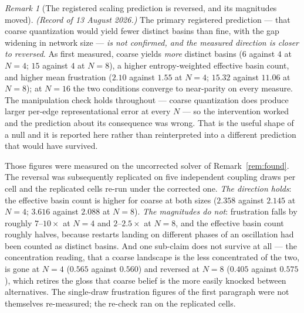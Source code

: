 \documentclass[11pt,a4paper]{article}
\theoremstyle{remark}
\newtheorem{remark}[definition]{Remark}
\begin{document}
\begin{remark}[The registered scaling prediction is reversed, and its magnitudes moved]\label{rem:null}
\emph{(Record of 13 August 2026.)} The primary registered prediction --- that coarse quantization would
yield fewer distinct basins than fine, with the gap widening in network size --- \emph{is not
confirmed, and the measured direction is closer to reversed}. As first measured, coarse yields
\emph{more} distinct basins ($6$ against $4$ at $N=4$; $15$ against $4$ at $N=8$), a higher
entropy-weighted effective basin count, and higher mean frustration ($2.10$ against $1.55$ at $N=4$;
$15.32$ against $11.06$ at $N=8$); at $N=16$ the two conditions converge to near-parity on every
measure. The manipulation check holds throughout --- coarse quantization does produce larger per-edge
representational error at every $N$ --- so the intervention worked and the prediction about its
consequence was wrong. That is the useful shape of a null and it is reported here rather than
reinterpreted into a different prediction that would have survived.

Those figures were measured on the uncorrected solver of Remark~\ref{rem:found}. The reversal was
subsequently replicated on five independent coupling draws per cell and the replicated cells re-run
under the corrected one. \emph{The direction holds}: the effective basin count is higher for coarse at
both sizes ($2.358$ against $2.145$ at $N=4$; $3.616$ against $2.088$ at $N=8$). \emph{The magnitudes
do not}: frustration falls by roughly $7$--$10\times$ at $N=4$ and $2$--$2.5\times$ at $N=8$, and the
effective basin count roughly halves, because restarts landing on different phases of an oscillation
had been counted as distinct basins. And one sub-claim does not survive at all --- the concentration
reading, that a coarse landscape is the less concentrated of the two, is gone at $N=4$ ($0.565$ against
$0.560$) and reversed at $N=8$ ($0.405$ against $0.575$), which retires the gloss that coarse belief is
the more easily knocked between alternatives. The single-draw frustration figures of the first
paragraph were not themselves re-measured; the re-check ran on the replicated cells.


\end{remark}
\end{document}
